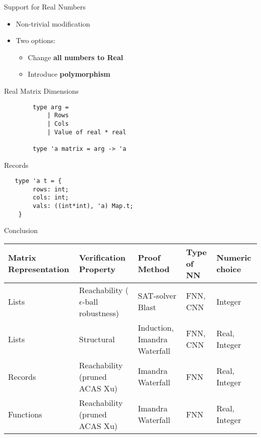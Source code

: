 \documentclass[handout]{beamer}
\begin{document}
\begin{frame}{Support for Real Numbers}
	\begin{itemize}
	\item Non-trivial modification
	\item Two options:

	\begin{itemize}
		\item<2->{Change \textbf{all numbers to Real}}
		\item<3->{Introduce \textbf{polymorphism}}
	\end{itemize}
	\end{itemize}
\end{frame}


\begin{frame}[fragile]{Real Matrix Dimensions}
	\begin{lstlisting}
		type arg =
			| Rows
			| Cols
			| Value of real * real
		
		type 'a matrix = arg -> 'a
	\end{lstlisting}
\end{frame}

\begin{frame}[fragile]{Records}
	\begin{lstlisting}
   type 'a t = {
		rows: int;
		cols: int;
		vals: ((int*int), 'a) Map.t;
	}
	\end{lstlisting}
\end{frame}

\begin{frame}{Conclusion}
	\scriptsize
	\begin{tabular}{ p{1.4cm} p{3cm} p{2.5cm} p{1cm} p{1.0cm} }
		\toprule
		\textbf{Matrix Representation} & \textbf{Verification Property} & \textbf{Proof Method}  & \textbf{Type of NN} & \textbf{Numeric choice} \\ 
		\midrule
		\rowcolor{lavender}
		Lists &	Reachability ($\epsilon$-ball robustness) & SAT-solver Blast & FNN, CNN & Integer  \\
		
		Lists & Structural & Induction, Imandra Waterfall & FNN, CNN  & Real, Integer  \\
		
		
		\rowcolor{lavender}
		Records & Reachability (pruned ACAS Xu) & Imandra Waterfall & FNN & Real, Integer \\
		
		Functions  &	Reachability (pruned ACAS Xu) &  Imandra Waterfall & FNN & Real, Integer  \\
		\bottomrule
	\end{tabular}
\end{frame}
\end{document}
